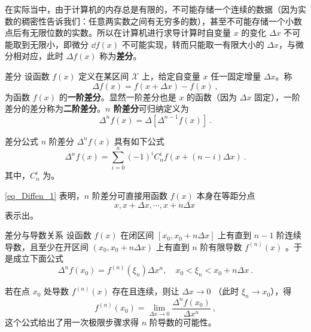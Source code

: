 在实际当中，由于计算机的内存总是有限的，不可能存储一个连续的数据（因为实数的稠密性告诉我们：任意两实数之间有无穷多的数），甚至不可能存储一个小数点后有无限位数的实数。所以在计算机进行求导计算时自变量 $x$ 的变化 $\Delta x$ 不可能取到无限小，即微分 $\dd f({x})$ 不可能实现，转而只能取一有限大小的 $\Delta x$，与微分相对应，此时 $\Delta f(x)$ 称为\textbf{差分}。
\begin{definition}{差分}
设函数 $f(x)$ 定义在某区间 $\mathcal{X}$ 上，给定自变量 $x$ 任一固定增量 $\Delta x$。称
\begin{equation}
\Delta f(x)=f(x+\Delta x)-f(x)~,
\end{equation}
为函数 $f(x)$ 的\textbf{一阶差分}。显然一阶差分也是 $x$ 的函数（因为 $\Delta x$ 固定），一阶差分的差分称为\textbf{二阶差分}。\textbf{$n$ 阶差分}可归纳定义为
\begin{equation}
\Delta^n f(x)=\Delta[\Delta^{n-1}f(x)]~.
\end{equation}
\end{definition}
\begin{theorem}{差分公式}\label{the_Diffen_1}
$n$ 阶差分 $\Delta^n f(x)$ 具有如下公式
\begin{equation}\label{eq_Diffen_1}
\Delta^nf(x)=\sum_{i=0}^n(-1)^iC_n^if(x+(n-i)\Delta x)~.
\end{equation}
其中，$C_n^i$ 为。
\end{theorem}
\autoref{eq_Diffen_1} 表明，$n$ 阶差分可直接用函数 $f(x)$ 本身在等距分点
\begin{equation}
x,x+\Delta x,\cdots,x+n\Delta x~
\end{equation}
表示出。
\begin{theorem}{差分与导数关系}\label{the_Diffen_2}
设函数 $f(x)$ 在闭区间 $[x_0,x_0+n\Delta x]$ 上有直到 $n-1$ 阶连续导数，且至少在开区间 $(x_0,x_0+n\Delta x)$ 上有直到 $n$ 阶有限导数 $f^{(n)}(x)$ 。于是成立下面公式
\begin{equation}\label{eq_Diffen_2}
\Delta^nf(x_0)=f^{(n)}(\xi_n)\Delta x^n ,\quad x_0<\xi_n<x_0+n\Delta x~.
\end{equation}
\end{theorem}
若在点 $x_0$ 处导数 $f^{(n)}(x)$ 存在且连续，则让 $\Delta x\rightarrow0$ （此时 $\xi_n\rightarrow x_0$），得
\begin{equation}
f^{(n)}(x_0)=\lim_{\Delta x\rightarrow0}\frac{\Delta^n f(x_0)}{\Delta x^n}~,
\end{equation}
 这个公式给出了用一次极限步骤求得 $n$ 阶导数的可能性。
